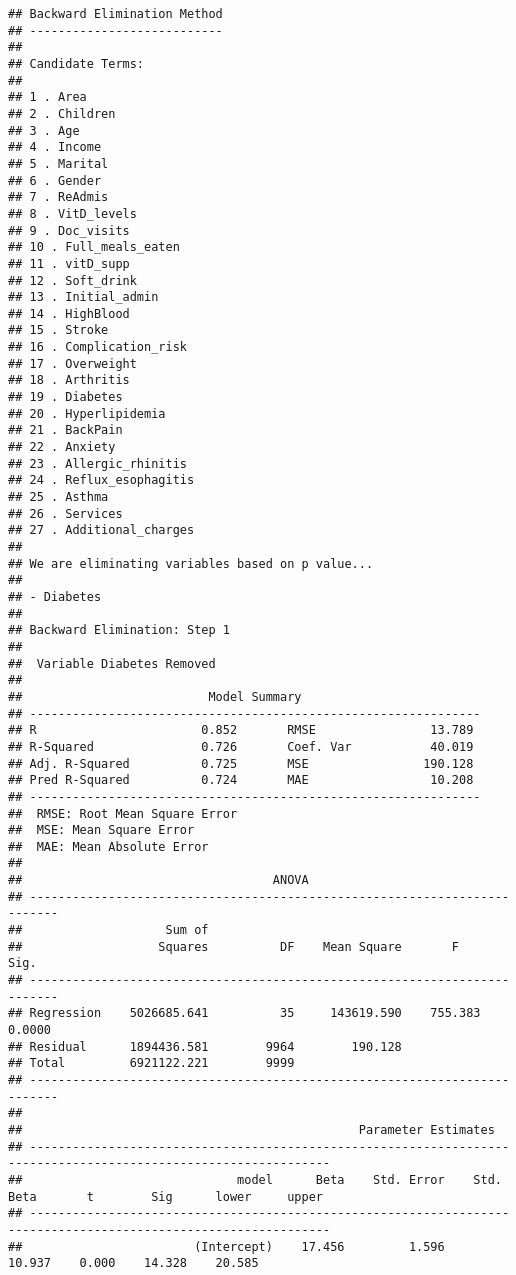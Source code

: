 \documentclass[
]{article}
\begin{document}
\begin{verbatim}
## Backward Elimination Method 
## ---------------------------
## 
## Candidate Terms: 
## 
## 1 . Area 
## 2 . Children 
## 3 . Age 
## 4 . Income 
## 5 . Marital 
## 6 . Gender 
## 7 . ReAdmis 
## 8 . VitD_levels 
## 9 . Doc_visits 
## 10 . Full_meals_eaten 
## 11 . vitD_supp 
## 12 . Soft_drink 
## 13 . Initial_admin 
## 14 . HighBlood 
## 15 . Stroke 
## 16 . Complication_risk 
## 17 . Overweight 
## 18 . Arthritis 
## 19 . Diabetes 
## 20 . Hyperlipidemia 
## 21 . BackPain 
## 22 . Anxiety 
## 23 . Allergic_rhinitis 
## 24 . Reflux_esophagitis 
## 25 . Asthma 
## 26 . Services 
## 27 . Additional_charges 
## 
## We are eliminating variables based on p value...
## 
## - Diabetes 
## 
## Backward Elimination: Step 1 
## 
##  Variable Diabetes Removed 
## 
##                          Model Summary                          
## ---------------------------------------------------------------
## R                       0.852       RMSE                13.789 
## R-Squared               0.726       Coef. Var           40.019 
## Adj. R-Squared          0.725       MSE                190.128 
## Pred R-Squared          0.724       MAE                 10.208 
## ---------------------------------------------------------------
##  RMSE: Root Mean Square Error 
##  MSE: Mean Square Error 
##  MAE: Mean Absolute Error 
## 
##                                   ANOVA                                    
## --------------------------------------------------------------------------
##                    Sum of                                                 
##                   Squares          DF    Mean Square       F         Sig. 
## --------------------------------------------------------------------------
## Regression    5026685.641          35     143619.590    755.383    0.0000 
## Residual      1894436.581        9964        190.128                      
## Total         6921122.221        9999                                     
## --------------------------------------------------------------------------
## 
##                                               Parameter Estimates                                                
## ----------------------------------------------------------------------------------------------------------------
##                              model      Beta    Std. Error    Std. Beta       t        Sig      lower     upper 
## ----------------------------------------------------------------------------------------------------------------
##                        (Intercept)    17.456         1.596                  10.937    0.000    14.328    20.585 

\end{verbatim}
\end{document}
